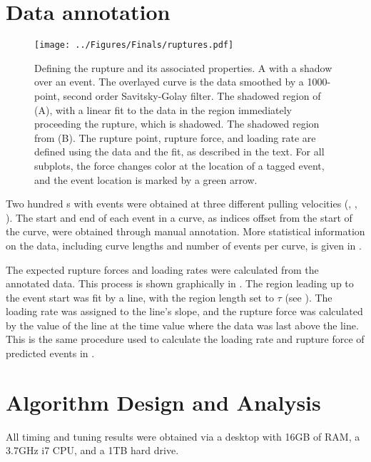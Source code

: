 \section{Data annotation}


\begin{figure}[htpb]
\caption[Definition of rupture force and loading rate]{ Defining the rupture and its associated properties.  A \fec{} with a shadow over an event. The overlayed curve is the data smoothed by a 1000-point, second order Savitsky-Golay filter.  The shadowed region of (A), with a linear fit to the data in the region immediately proceeding the rupture, which is shadowed.  The shadowed region from (B). The rupture point, rupture force, and loading rate are defined using the data and the fit, as described in the text. For all subplots, the force changes color at the location of a tagged event, and the event location is marked by a green arrow. }
\centering
\texttt{[image: ../Figures/Finals/ruptures.pdf]}%
\end{figure}

Two hundred \fec{}s with events were obtained at three different pulling velocities (, , ). The start and end of each event in a curve, as indices offset from the start of the curve, were obtained through manual annotation. More statistical information on the data, including curve lengths and number of events per curve, is given in .

The expected rupture forces and loading rates were calculated from the annotated data. This process is shown graphically in . The region leading up to the event start was fit by a line, with the region length set to $\tau$ (see ). The loading rate was assigned to the line's slope, and the rupture force was calculated by the value of the line at the time value where the data was last above the line. This is the same procedure used to calculate the loading rate and rupture force of predicted events in . 



\section{Algorithm Design and Analysis}

All timing and tuning results were obtained via a desktop with 16GB of RAM, a 3.7GHz i7 CPU, and a 1TB hard drive. 

